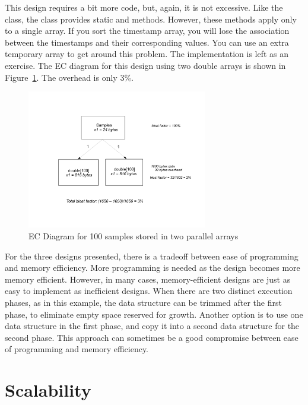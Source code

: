 This design requires a bit more code, but, again, it is not excessive. Like the
 class, the  class provides static 
and   methods. However, these methods apply only to a single
array. If you sort the timestamp array, you will lose the association between
the timestamps and their corresponding values. You can use an extra temporary
array to get around this problem. The implementation is left as an exercise. The
EC diagram for this design using two double arrays is shown in
Figure~\ref{fig:content-schematic-arrays-doubles}. The overhead is only 3\%.

\begin{figure}
  \centering
  \includegraphics[width=0.7\textwidth]{part1/Figures/memoryhealth/array-doubles}
  \caption{EC Diagram for 100 samples stored in two parallel arrays}
  \label{fig:content-schematic-arrays-doubles}
\end{figure}

For the three designs presented, there is a tradeoff between ease of programming
and memory efficiency. More programming is needed as the design becomes more
memory efficient. However, in many cases, memory-efficient designs are just as
easy to implement as inefficient designs. When there are two distinct execution
phases, as in this example, the data structure can be trimmed after the first
phase, to eliminate empty space reserved for growth. Another option is to use
one data structure in the first phase, and copy it into a second data structure
for the second phase. This approach can sometimes be a good compromise between
ease of programming and memory efficiency.
 
\section{Scalability}
\label{sec:scalability}

